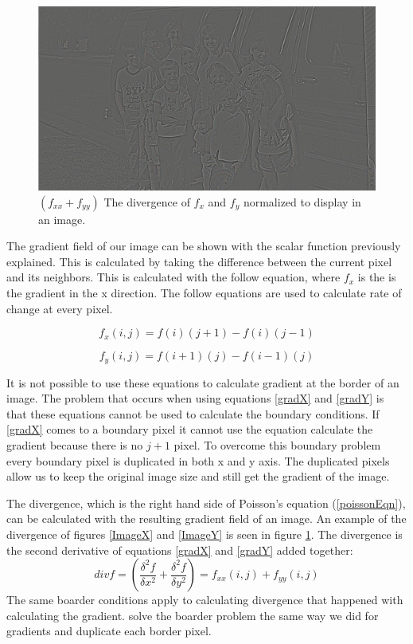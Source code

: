 \documentclass[10pt,twopage]{acmsiggraph}
\begin{document}
\begin{figure}
\centering
\includegraphics[width=.44\textwidth]{fig/divG.jpg}
\caption{\ensuremath{(f_{xx} + f_{yy})} The divergence of \ensuremath{f_{x}} and \ensuremath{f_{y}} normalized to display in an image.}
\label{div}
\end{figure}

The gradient field of our image can be shown with the scalar function previously explained. This is calculated by taking the difference between the current pixel and its neighbors. This is calculated with the follow equation, where \ensuremath{f_{x}} is the is the gradient in the x direction. The follow equations are used to calculate rate of change at every pixel. 

\begin{equation}
\ensuremath{f_{x}(i,j) = f(i)(j+1) - f(i)(j-1)}
\label{gradX}
\end{equation}

\begin{equation}
\ensuremath{f_{y}(i,j) = f(i+1)(j) - f(i-1)(j)}
\label{gradY}
\end{equation}

It is not possible to use these equations to calculate gradient at the border of an image.  The problem that occurs when using equations \ref{gradX} and \ref{gradY} is that these equations cannot be used to calculate the boundary conditions. If \ref{gradX} comes to a  boundary pixel it cannot use the equation calculate the gradient because there is no $j+1$ pixel. To overcome this boundary problem every boundary pixel is duplicated in both x and y axis. The duplicated pixels allow us to keep the original image size and still get the gradient of the image.

The divergence, which is the right hand side of Poisson's equation (\ref{poissonEqn}), can be calculated with the resulting gradient field of an image. An example of the divergence of figures \ref{ImageX} and \ref{ImageY} is seen in figure \ref{div}. The divergence is the second derivative of equations \ref{gradX} and \ref{gradY} added together:
\begin{equation}
\label{divergence}
div f = ( \frac{\delta^2 f}{\delta x^2} + \frac{\delta^2 f}{\delta y^2} ) = f_{xx}(i,j) + f_{yy}(i,j)
\end{equation}
The same boarder conditions apply to calculating divergence that happened with calculating the gradient. solve the boarder problem the same way we did for gradients and duplicate each border pixel.
\end{document}
